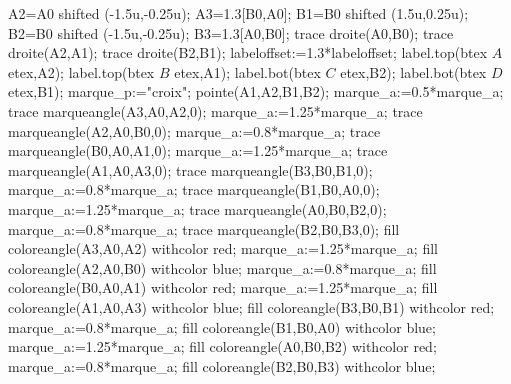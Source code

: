 \begin{corrige}
\begin{enumerate}
\begin{Geometrie}[CoinHD={(5.5u,3u)}]
         A2=A0 shifted (-1.5u,-0.25u);
         A3=1.3[B0,A0];
         B1=B0 shifted (1.5u,0.25u);
         B2=B0 shifted (-1.5u,-0.25u);
         B3=1.3[A0,B0];
         trace droite(A0,B0);
         trace droite(A2,A1);
         trace droite(B2,B1);
         labeloffset:=1.3*labeloffset;
         label.top(btex $A$ etex,A2);
         label.top(btex $B$ etex,A1);
         label.bot(btex $C$ etex,B2);
         label.bot(btex $D$ etex,B1);         
         marque_p:="croix";
         pointe(A1,A2,B1,B2);
         marque_a:=0.5*marque_a;
         trace marqueangle(A3,A0,A2,0);
         marque_a:=1.25*marque_a;
         trace marqueangle(A2,A0,B0,0);
         marque_a:=0.8*marque_a;
         trace marqueangle(B0,A0,A1,0);
         marque_a:=1.25*marque_a;
         trace marqueangle(A1,A0,A3,0);
         trace marqueangle(B3,B0,B1,0);
         marque_a:=0.8*marque_a;
         trace marqueangle(B1,B0,A0,0);
         marque_a:=1.25*marque_a;
         trace marqueangle(A0,B0,B2,0);
         marque_a:=0.8*marque_a;
         trace marqueangle(B2,B0,B3,0);
         fill coloreangle(A3,A0,A2) withcolor red;
         marque_a:=1.25*marque_a;
         fill coloreangle(A2,A0,B0) withcolor blue;
         marque_a:=0.8*marque_a;
         fill coloreangle(B0,A0,A1) withcolor red;
         marque_a:=1.25*marque_a;
         fill coloreangle(A1,A0,A3) withcolor blue;
         fill coloreangle(B3,B0,B1) withcolor red;
         marque_a:=0.8*marque_a;
         fill coloreangle(B1,B0,A0) withcolor blue;
         marque_a:=1.25*marque_a;
         fill coloreangle(A0,B0,B2) withcolor red;
         marque_a:=0.8*marque_a;
         fill coloreangle(B2,B0,B3) withcolor blue;
      \end{Geometrie}
   \end{enumerate}
 \end{corrige}